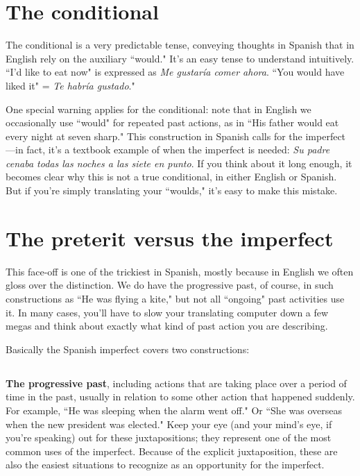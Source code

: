 \section{The conditional}

The conditional is a very predictable tense, conveying
thoughts in Spanish that in English rely on the auxiliary ``would." It's
an easy tense to understand intuitively. ``I'd like to eat now" is expressed as \emph{Me gustaría comer ahora}. ``You would have liked it" = \emph{Te habría gustado}."

One special warning applies for the conditional: note that in
English we occasionally use ``would" for repeated past actions, as in
``His father would eat every night at seven sharp." This construction
in Spanish calls for the imperfect---in fact, it's a textbook example of
when the imperfect is needed: \emph{Su padre cenaba todas las noches a las
	siete en punto}. If you think about it long enough, it becomes clear why
this is not a true conditional, in either English or Spanish. But if you're
simply translating your ``woulds," it's easy to make this mistake.

\section{The preterit versus the imperfect}

This face-off is one of the trickiest in Spanish, mostly because
in English we often gloss over the distinction. We do have the progressive past, of course, in such constructions as ``He was flying a kite,"
but not all ``ongoing" past activities use it. In many cases, you'll have
to slow your translating computer down a few megas and think about
exactly what kind of past action you are describing.

Basically the Spanish imperfect covers two constructions:

\subsection{}

\textbf{The progressive past}, including actions that are taking
place over a period of time in the past, usually in relation to some
other action that happened suddenly. For example, ``He was sleeping
when the alarm went off." Or ``She was overseas when the new president was elected." Keep your eye (and your mind's eye, if you're speaking)
out for these juxtapositions; they represent one of the most common uses of the imperfect. Because of the explicit juxtaposition, these
are also the easiest situations to recognize as an opportunity for the
imperfect.

